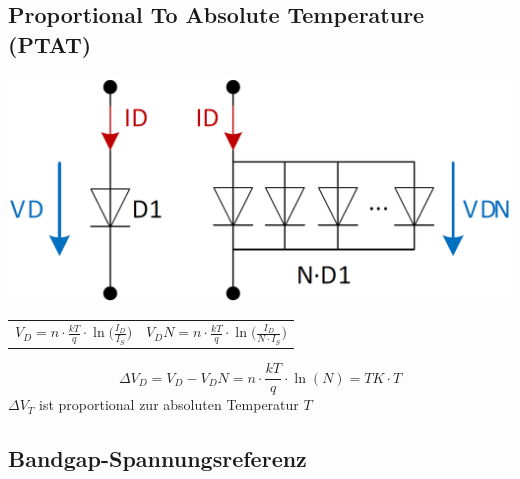 \subsection{Proportional To Absolute Temperature (PTAT)}

\begin{minipage}[c]{0.28\columnwidth}
    \includegraphics[width=\columnwidth]{images/ptat.png}
\end{minipage}
\hfill
\begin{minipage}[c]{0.7\columnwidth}

    \begin{tabular}{@{}c c@{}}
        $V_D = n \cdot \frac{k T}{q} \cdot \ln \Big( \frac{I_D}{I_S} \Big)$ & 
        $V_DN = n \cdot \frac{k T}{q} \cdot \ln \Big( \frac{I_D}{N \cdot I_S} \Big)$
    \end{tabular}

    $$ \boxed{ \Delta V_D = V_D - V_DN = n \cdot \frac{k T}{q} \cdot \ln(N)  = TK \cdot T }$$
    \textrightarrow $\Delta V_T$ ist proportional zur absoluten Temperatur $T$
\end{minipage}


\subsection{Bandgap-Spannungsreferenz}


